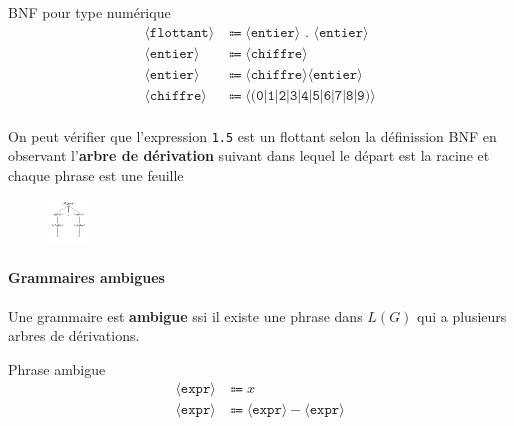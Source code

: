 \documentclass{report}
\begin{document}
\begin{multicols*}{3}
    \begin{EExample}{BNF pour type numérique}{}
        \begin{align*}
            \langle \texttt{flottant}   \rangle &\Coloneqq \langle\texttt{entier}\rangle \texttt{ . }  \langle \texttt{entier}   \rangle \\
            \langle \texttt{entier}   \rangle &\Coloneqq \langle\texttt{chiffre}\rangle \\ 
            \langle \texttt{entier}   \rangle &\Coloneqq \langle\texttt{chiffre}\rangle \langle\texttt{entier}\rangle \\
            \langle \texttt{chiffre}   \rangle &\Coloneqq \langle\texttt{(0|1|2|3|4|5|6|7|8|9)}\rangle \\
        \end{align*}
    \end{EExample}

    On peut vérifier que l'expression \texttt{1.5} est un flottant selon la
    définission BNF en observant l'\textbf{arbre de dérivation} suivant dans
    lequel le départ est la racine et chaque phrase est une feuille

    \begin{figure}[H]
        \begin{center}
            \includegraphics[width=0.10\textwidth]{expression1point5.png}
        \end{center}
    \end{figure}

    \paragraph{Grammaires ambigues}
    Une grammaire est \textbf{ambigue} ssi il existe une phrase dans $L(G)$ qui
    a plusieurs arbres de dérivations. 

    \begin{EExample}{Phrase ambigue}{}
        \begin{align*}
            \langle \texttt{expr} \rangle  &\Coloneqq x \\
            \langle \texttt{expr} \rangle &\Coloneqq \langle \texttt{expr}   \rangle - \langle \texttt{expr}   \rangle
        \end{align*}
    \end{EExample}


\end{multicols*}
\end{document}
